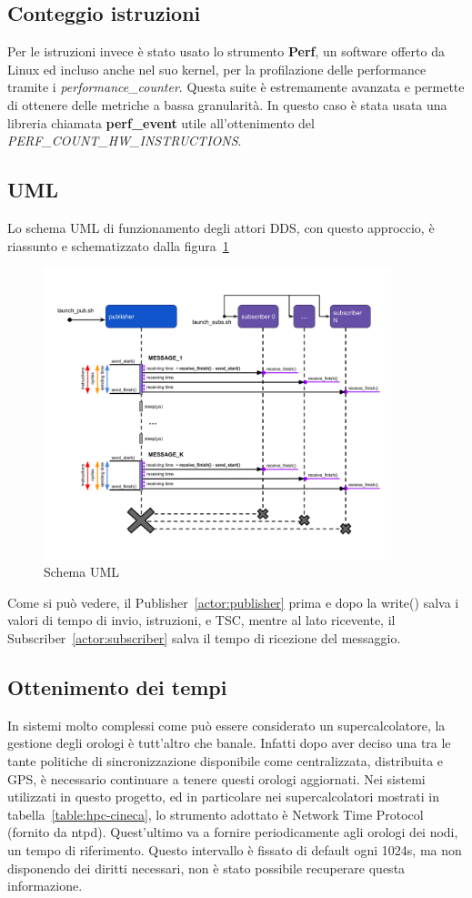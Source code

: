 \subsection{Conteggio istruzioni}
Per le istruzioni invece è stato usato lo strumento \textbf{Perf}, un software offerto da Linux ed incluso anche nel suo kernel, per la profilazione delle performance tramite i \emph{performance\_counter}. Questa suite è estremamente avanzata e permette di ottenere delle metriche a bassa granularità. In questo caso è stata usata una libreria chiamata \textbf{perf\_event} utile all'ottenimento del \emph{PERF\_COUNT\_HW\_INSTRUCTIONS}.
\subsection{UML}
Lo schema UML di funzionamento degli attori DDS, con questo approccio, è riassunto e schematizzato dalla figura~\ref{fig:uml}
\begin{figure}[H]
    \centering
    \includegraphics[width=0.9\textwidth]{./img/umel-send-receive.png}
    \caption{Schema UML}\label{fig:uml}
\end{figure}
Come si può vedere, il Publisher~\ref{actor:publisher} prima e dopo la write() salva i valori di tempo di invio, istruzioni, e TSC, mentre al lato ricevente, il Subscriber~\ref{actor:subscriber} salva il tempo di ricezione del messaggio.
\subsection{Ottenimento dei tempi}
In sistemi molto complessi come può essere considerato un supercalcolatore, la gestione degli orologi è tutt'altro che banale. Infatti dopo aver deciso una tra le tante politiche di sincronizzazione disponibile come centralizzata, distribuita e GPS, è necessario continuare a tenere questi orologi aggiornati. Nei sistemi utilizzati in questo progetto, ed in particolare nei supercalcolatori mostrati in tabella~\ref{table:hpc-cineca}, lo strumento adottato è Network Time Protocol (fornito da ntpd). 
Quest'ultimo va a fornire periodicamente agli orologi dei nodi, un tempo di riferimento. Questo intervallo è fissato di default ogni 1024s, ma non disponendo dei diritti necessari, non è stato possibile recuperare questa informazione.


